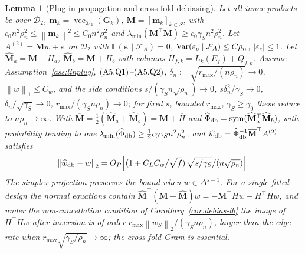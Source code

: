 \documentclass[12pt]{article}
\newtheorem{lemma}{Lemma}
\newcommand{\E}{\mathbb{E}}
\newcommand{\1}{\mathbf{1}}
\newcommand{\norm}[1]{\left\lVert#1\right\rVert}
\providecommand{\sym}{\operatorname{sym}}
\begin{document}
\begin{lemma}[Plug-in propagation and cross-fold debiasing]
\label{lem:plugin}
Let all inner products be over $\mathcal D_2$, $\mathbf m_k=\operatorname{vec}_{\mathcal
D_2}(\mathbf G_k)$, $\mathbf M=[\mathbf m_k]_{k\in S}$, with $c_0n^2\rho_n^2\le\norm{\mathbf
m_k}^2\le C_0n^2\rho_n^2$ and $\lambda_{\min}(\mathbf M^\top\mathbf M)\ge c_0\gamma_S n^2\rho_n^2$.
Let $A^{(2)}=\mathbf Mw+\bm\varepsilon$ on $\mathcal D_2$ with $\E(\bm\varepsilon\mid\mathcal
F_A)=0$, ${\rm Var}(\varepsilon_e\mid\mathcal F_A)\le C\rho_n$, $|\varepsilon_e|\le1$. Let
$\widehat{\mathbf M}_a=\mathbf M+H_a$, $\widehat{\mathbf M}_b=\mathbf M+H_b$ with columns
$H_{f,k}=L_k(E_f)+Q_{f,k}$. Assume Assumption~\ref{ass:linplug}, $({\rm A5.Q1})$--$({\rm A5.Q2})$,
$\delta_n:=\sqrt{r_{\max}/(n\rho_n)}\to0$, $\norm{w}_1\le C_w$, and the side conditions
$s/(\gamma_S n\sqrt{\rho_n})\to0$, $s\delta_n^2/\gamma_S\to0$, $\delta_n/\sqrt{\gamma_S}\to0$,
$r_{\max}/(\gamma_S n\rho_n)\to0$; for fixed $s$, bounded $r_{\max}$, $\gamma_S\ge\gamma_0$ these
reduce to $n\rho_n\to\infty$. With $\overline{\mathbf M}=\tfrac12(\widehat{\mathbf
M}_a+\widehat{\mathbf M}_b)=\mathbf M+\overline H$ and $\widehat\Phi_{\rm db}=\sym(\widehat{\mathbf
M}_a^\top\widehat{\mathbf M}_b)$, with probability tending to one $\lambda_{\min}(\widehat\Phi_{\rm
db})\ge\tfrac12 c_0\gamma_S n^2\rho_n^2$, and $\widehat w_{\rm db}=\widehat\Phi_{\rm
db}^{-1}\overline{\mathbf M}^\top A^{(2)}$ satisfies
\[
        \norm{\widehat w_{\rm db}-w}_2=O_P\Bigl[(1+C_LC_w/\sqrt f)\,\sqrt{s/\gamma_S}/(n\sqrt{\rho_n})\Bigr].
\]
The simplex projection preserves the bound when $w\in\Delta^{s-1}$. For a single fitted design the
normal equations contain $\widehat{\mathbf M}^\top(\mathbf M-\widehat{\mathbf M})w=-\mathbf M^\top
Hw-H^\top Hw$, and under the non-cancellation condition of Corollary~\ref{cor:debias-lb} the image
of $H^\top Hw$ after inversion is of order $r_{\max}\norm{w_S}_2/(\gamma_S n\rho_n)$, larger than
the edge rate when $r_{\max}\sqrt{\gamma_S/\rho_n}\to\infty$; the cross-fold Gram is essential.
\end{lemma}
\end{document}
